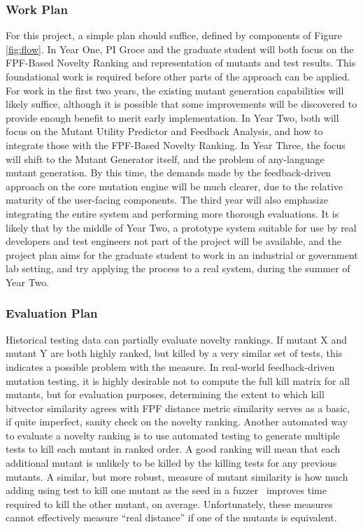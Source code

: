 \subsubsection{Work Plan}

For this project, a simple plan should suffice, defined by components
of Figure \ref{fig:flow}.  In Year One, PI Groce and the graduate
student will both focus on the FPF-Based Novelty Ranking and
representation of mutants and test results.  This foundational work is
required before other parts of the approach can be applied.  For work
in the first two years, the existing mutant generation capabilities
will likely suffice, although it is possible that some improvements
will be discovered to provide enough benefit to merit early
implementation.  In Year
Two, both will focus on the Mutant Utility Predictor and Feedback
Analysis, and how to integrate those with the FPF-Based Novelty
Ranking.  In Year Three, the focus will shift to the Mutant Generator
itself, and the problem of any-language mutant generation.  By this
time, the demands made by the feedback-driven approach on the core
mutation engine will be much clearer, due to the relative maturity of
the user-facing components.  The third
year will also emphasize integrating the entire system and performing
more thorough evaluations.  It is likely that by the middle of Year
Two, a prototype system suitable for use by real developers and test
engineers not part of the project will be available, and the project
plan aims for the graduate student to work in an industrial or
government lab setting, and try applying the process to a real system,
during the summer of Year Two.

\subsubsection{Evaluation Plan}

Historical testing data can partially evaluate novelty rankings.  If
mutant X and mutant Y are both highly ranked, but killed by a very
similar set of tests, this indicates a possible problem with the
measure.  In real-world feedback-driven mutation testing, it is highly
desirable not to compute the full kill matrix for all mutants, but
for evaluation purposes, determining the extent to which kill
bitvector similarity agrees with FPF distance metric similarity serves
as a basic, if quite imperfect, sanity check on the novelty ranking.
Another automated way to evaluate a novelty ranking is to use automated
testing to generate multiple tests to kill each mutant in ranked order.  A good ranking will mean
that each additional mutant is unlikely to be killed by the killing
tests for any previous mutants.  A similar, but more robust, measure of mutant similarity
is how much adding using test to kill one mutant as the seed in a
fuzzer~\cite{aflfuzz,libfuzzer} improves time required to kill the other
mutant, on average.  Unfortunately, these measures cannot effectively
measure ``real distance'' if one of the mutants is equivalent.